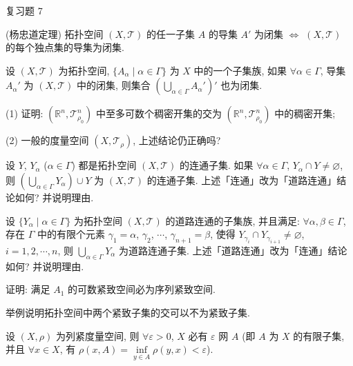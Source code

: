 
\begin{exblock}{复习题 7}
  \item (杨忠道定理) 拓扑空间 $(X, \mathcal{T})$ 的任一子集 $A$ 的导集 $A'$ 为闭集 $\iff$ $(X, \mathcal{T})$ 的每个独点集的导集为闭集.

  \item 设 $(X, \mathcal{T})$ 为拓扑空间, $\{A_{\alpha} \mid \alpha \in \Gamma\}$ 为 $X$ 中的一个子集族, 如果 $\forall \alpha \in \Gamma$, 导集 $A_{\alpha}'$ 为 $(X, \mathcal{T})$ 中的闭集, 则集合 $\left(\bigcup\limits_{\alpha \in \Gamma} A_{\alpha}'\right)'$ 也为闭集.

  \item (1) 证明: $(\mathbb{R}^{n}, \mathcal{T}_{\rho_{0}}^{n})$ 中至多可数个稠密开集的交为 $(\mathbb{R}^{n}, \mathcal{T}_{\rho_{0}}^{n})$ 中的稠密开集;

  (2) 一般的度量空间 $(X, \mathcal{T}_{\rho})$, 上述结论仍正确吗?

  \item 设 $Y$, $Y_{\alpha}$ ($\alpha \in \Gamma$) 都是拓扑空间 $(X, \mathcal{T})$ 的连通子集. 如果 $\forall \alpha \in \Gamma$, $Y_{\alpha} \cap Y \neq \varnothing$, 则 $\left(\bigcup\limits_{\alpha \in \Gamma} Y_{\alpha}\right) \cup Y$ 为 $(X, \mathcal{T})$ 的连通子集. 上述「连通」改为「道路连通」结论如何? 并说明理由.

  \item 设 $\{Y_{\alpha} \mid \alpha \in \Gamma\}$ 为拓扑空间 $(X, \mathcal{T})$ 的道路连通的子集族, 并且满足: $\forall \alpha, \beta \in \Gamma$, 存在 $\Gamma$ 中的有限个元素 $\gamma_{1} = \alpha$, $\gamma_{2}$, $\cdots$, $\gamma_{n+1} = \beta$, 使得 $Y_{\gamma_{i}} \cap Y_{\gamma_{i+1}} \neq \varnothing$, $i = 1, 2, \cdots, n$, 则 $\bigcup\limits_{\alpha \in \Gamma} Y_{\alpha}$ 为道路连通子集. 上述「道路连通」改为「连通」结论如何? 并说明理由.

  \item 证明: 满足 $A_{1}$ 的可数紧致空间必为序列紧致空间.

  \item 举例说明拓扑空间中两个紧致子集的交可以不为紧致子集.

  \item 设 $(X, \rho)$ 为列紧度量空间, 则 $\forall \varepsilon > 0$, $X$ 必有 $\varepsilon$ 网 $A$ (即 $A$ 为 $X$ 的有限子集, 并且 $\forall x \in X$, 有 $\rho(x, A) = \inf\limits_{y \in A} \rho(y, x) < \varepsilon$).


\end{exblock}
